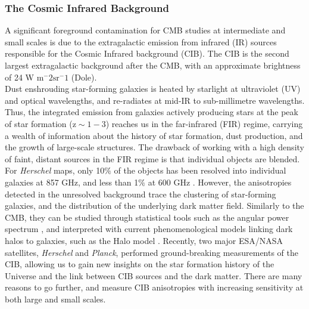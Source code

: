 \subsubsection{The Cosmic Infrared Background} 
\vspace{-0.05in}
A significant foreground contamination for CMB studies at
intermediate and small scales is due to the extragalactic
emission from infrared (IR) sources responsible for the Cosmic
Infrared background (CIB). The CIB is the second largest
extragalactic background after the CMB, with an approximate
brightness of 24 W m$\mathrm{^-2 sr^-1}$ (Dole).\\
Dust enshrouding star-forming galaxies is heated by starlight
at ultraviolet (UV) and optical wavelengths, and re-radiates at
mid-IR to sub-millimetre wavelengths. Thus, the integrated emission
from galaxies actively producing stars at the peak of star formation
($\mathrm{z\sim 1-3}$) reaches us in the far-infrared (FIR) regime,
carrying a wealth of information about the history of star formation,
dust production, and the growth of large-scale structures.
The drawback of working with a high density of faint, distant sources in the FIR
regime is that individual objects are blended. For {\it Herschel}
maps, only 10$\%$ of the objects has been resolved
into individual galaxies at 857 GHz, and less than 1$\%$ at 600 GHz
\cite{bethermin2012}. However, the anisotropies detected in the
unresolved background trace the clustering of star-forming galaxies,
and the distribution of the underlying dark matter field.
Similarly to the CMB, they can be studied through statistical tools
such as the angular power spectrum \citep{knox2001}, and interpreted with current
phenomenological models linking dark halos to galaxies, such as the Halo model \cite{shang}.
Recently, two major ESA/NASA satellites, {\it Herschel} and {\it Planck},
performed ground-breaking measurements of the CIB,
allowing us to gain new insights on the star formation
history of the Universe and the link between CIB sources
and the dark matter. There are many reasons to go further,
and measure CIB anisotropies with increasing sensitivity at both large and small scales.
